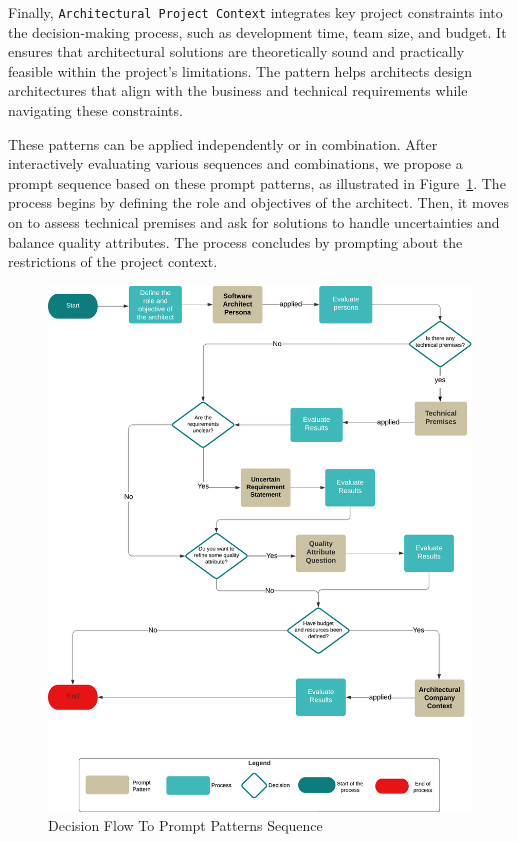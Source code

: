 \documentclass[runningheads]{llncs}
\begin{document}
Finally, \texttt{Architectural Project Context} integrates key project constraints into the decision-making process, such as development time, team size, and budget. It ensures that architectural solutions are theoretically sound and practically feasible within the project's limitations. The pattern helps architects design architectures that align with the business and technical requirements while navigating these constraints.

These patterns can be applied independently or in combination. After interactively evaluating various sequences and combinations, we propose a prompt sequence based on these prompt patterns, as illustrated in Figure~\ref{fig:flowchart-sequence}. The process begins by defining the role and objectives of the architect. Then, it moves on to assess technical premises and ask for solutions to handle uncertainties and balance quality attributes. The process concludes by prompting about the restrictions of the project context.

\begin{figure}[!ht]
  \centering  
  \includegraphics[width=0.95\linewidth]{flowchart-senquence.png}
  \caption{Decision Flow To Prompt Patterns Sequence}  
  \label{fig:flowchart-sequence}
\end{figure}
\end{document}
